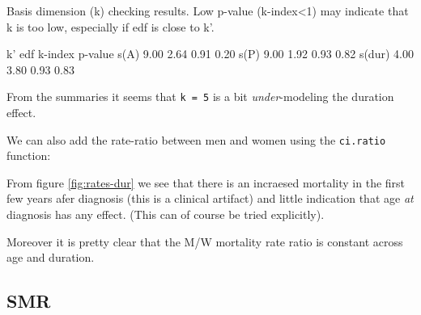 \begin{enumerate}[resume]
\begin{Schunk}
\begin{Soutput}
Basis dimension (k) checking results. Low p-value (k-index<1) may
indicate that k is too low, especially if edf is close to k'.

         k'  edf k-index p-value
s(A)   9.00 2.64    0.91    0.20
s(P)   9.00 1.92    0.93    0.82
s(dur) 4.00 3.80    0.93    0.83
\end{Soutput}
\end{Schunk}
From the summaries it seems that \texttt{k = 5} is a bit \emph{under}-modeling the
duration effect.

We can also add the rate-ratio between men and women using the
\texttt{ci.ratio} function:
\begin{Schunk}
\end{Schunk}
From figure \ref{fig:rates-dur} we see that there is an incraesed
mortality in the first few years afer diagnosis (this is a clinical
artifact) and little indication that age \emph{at} diagnosis has any effect.
(This can of course be tried explicitly).

Moreover it is pretty clear that the M/W mortality rate ratio is
constant across age and duration.

\end{enumerate}

\subsection*{SMR}

